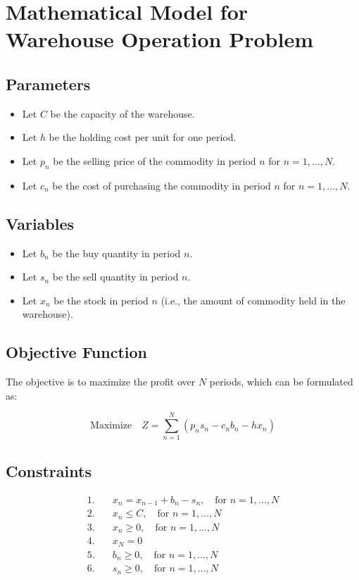 \documentclass{article}
\begin{document}
\section*{Mathematical Model for Warehouse Operation Problem}

\subsection*{Parameters}
\begin{itemize}
    \item Let \( C \) be the capacity of the warehouse.
    \item Let \( h \) be the holding cost per unit for one period.
    \item Let \( p_n \) be the selling price of the commodity in period \( n \) for \( n = 1, \ldots, N \).
    \item Let \( c_n \) be the cost of purchasing the commodity in period \( n \) for \( n = 1, \ldots, N \).
\end{itemize}

\subsection*{Variables}
\begin{itemize}
    \item Let \( b_n \) be the buy quantity in period \( n \).
    \item Let \( s_n \) be the sell quantity in period \( n \).
    \item Let \( x_n \) be the stock in period \( n \) (i.e., the amount of commodity held in the warehouse).
\end{itemize}

\subsection*{Objective Function}
The objective is to maximize the profit over \( N \) periods, which can be formulated as:

\[
\text{Maximize} \quad Z = \sum_{n=1}^{N} \left( p_n s_n - c_n b_n - h x_n \right)
\]

\subsection*{Constraints}
\begin{align*}
    1. & \quad x_n = x_{n-1} + b_n - s_n, \quad \text{for } n = 1, \ldots, N \\
    2. & \quad x_n \leq C, \quad \text{for } n = 1, \ldots, N \\
    3. & \quad x_n \geq 0, \quad \text{for } n = 1, \ldots, N \\
    4. & \quad x_N = 0  \\
    5. & \quad b_n \geq 0, \quad \text{for } n = 1, \ldots, N \\
    6. & \quad s_n \geq 0, \quad \text{for } n = 1, \ldots, N
\end{align*}
\end{document}

